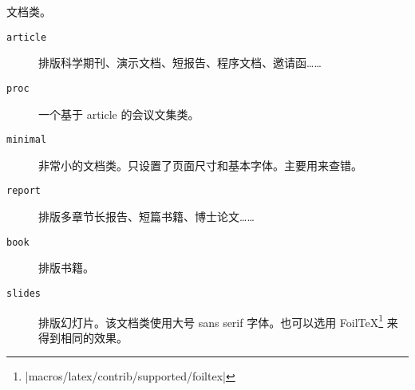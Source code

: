 \begin{table}[!bp]
\caption{文档类。} \label{documentclasses}
\begin{lined}{\textwidth}
\begin{description}

\item [\normalfont\texttt{article}] 排版科学期刊、演示文档、短报告、程序文档、邀请函……
\item [\normalfont\texttt{proc}] 一个基于 article 的会议文集类。
\item [\normalfont\texttt{minimal}] 非常小的文档类。只设置了页面尺寸和基本字体。主要用来查错。
\item [\normalfont\texttt{report}] 排版多章节长报告、短篇书籍、博士论文……
\item [\normalfont\texttt{book}] 排版书籍。
\item [\normalfont\texttt{slides}] 排版幻灯片。该文档类使用大号 sans
serif 字体。也可以选用 Foil\TeX{}\footnote{%
        \CTANref|macros/latex/contrib/supported/foiltex|} 来得到相同的效果。
\end{description}
\end{lined}
\end{table}

